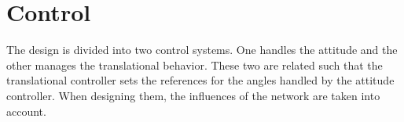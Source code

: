 \section{Control}\label{sec:control}
The design is divided into two control systems. One handles the attitude and the other manages the translational behavior. These two are related such that the translational controller sets the references for the angles handled by the attitude controller. When designing them, the influences of the network are taken into account.